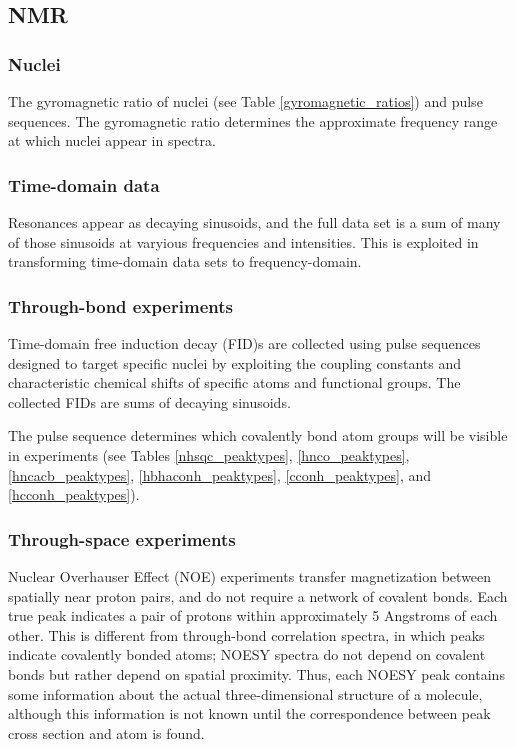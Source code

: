 \subsection*{NMR}

\subsubsection{Nuclei}
The gyromagnetic ratio of nuclei (see Table \ref{gyromagnetic_ratios}) and 
pulse sequences.  The gyromagnetic ratio determines the approximate 
frequency range at which nuclei appear in spectra.

\subsubsection{Time-domain data}
Resonances appear as decaying sinusoids, and the full data set is a sum of
many of those sinusoids at varyious frequencies and intensities.
This is exploited in transforming time-domain data sets to frequency-domain.

\subsubsection{Through-bond experiments}
Time-domain free induction decay (FID)s are collected using
pulse sequences \cite{khaneja2005} designed to target specific nuclei by
exploiting the coupling constants and characteristic chemical shifts of specific 
atoms and functional groups.  The collected FIDs are sums of decaying sinusoids.

The pulse sequence
determines which covalently bond atom groups will be visible in experiments
(see Tables \ref{nhsqc_peaktypes}, \ref{hnco_peaktypes}, 
\ref{hncacb_peaktypes}, \ref{hbhaconh_peaktypes}, \ref{cconh_peaktypes}, and
\ref{hcconh_peaktypes}).

\subsubsection{Through-space experiments}
Nuclear Overhauser Effect (NOE) \cite{noe_kaiser} experiments transfer 
magnetization between spatially near proton pairs, and do not require a 
network of covalent bonds.  Each true peak indicates a pair of protons within 
approximately 5 Angstroms of each other.  This is different from 
through-bond correlation spectra, in which peaks indicate covalently 
bonded atoms; NOESY spectra do not depend on covalent bonds but rather 
depend on spatial proximity.  Thus, each NOESY peak contains some information 
about the actual three-dimensional structure of a molecule, although this
information is not known until the correspondence between peak cross
section and atom is found.

